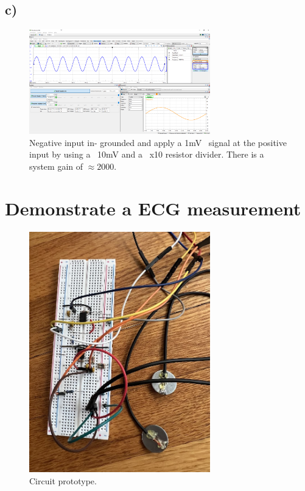 \documentclass{article}
\begin{document}
		\subsection*{c)}
			\begin{figure}[H]
				\centering
				\includegraphics[width=0.7\textwidth]{w1}
				\caption{Negative input in- grounded and apply a 1mV ~signal at the positive input by using a
				~10mV and a ~x10 resistor divider. There is a system gain of $\approx 2000$.}
			\end{figure}

	\section{Demonstrate a ECG measurement}

		\begin{figure}[H]
			\centering
			\includegraphics[width=0.7\textwidth]{p1}
			\caption{Circuit prototype.}
		\end{figure}
\end{document}
